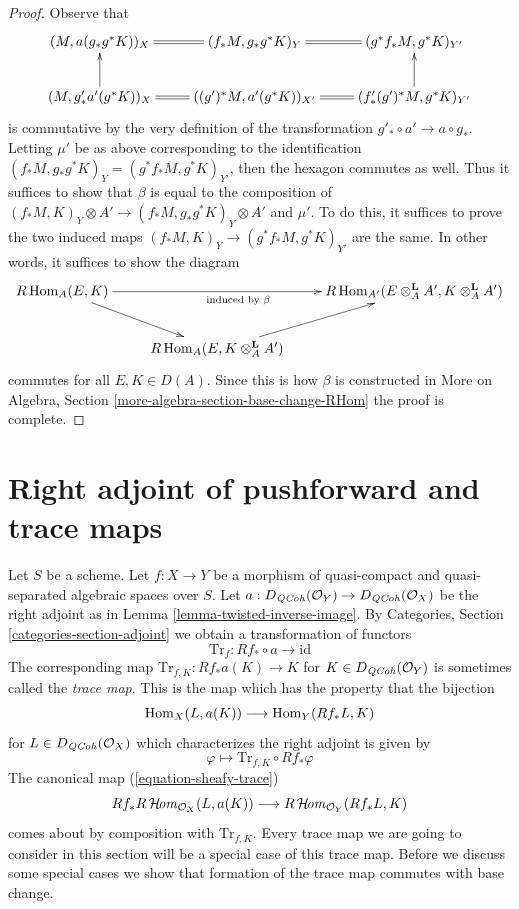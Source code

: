 \begin{proof}
\medskip\noindent
Observe that
$$
\xymatrix{
(M, a(g_*g^*K))_X &
(f_*M, g_* g^*K)_Y \ar@{=}[l] &
(g^*f_*M, g^*K)_{Y'} \ar@{=}[l] \\
(M, g'_* a'(g^*K))_X \ar[u] &
((g')^*M, a'(g^*K))_{X'} \ar@{=}[l] &
(f'_*(g')^*M, g^*K)_{Y'} \ar@{=}[l] \ar[u]
}
$$
is commutative by the very definition of the transformation
$g'_* \circ a' \to a \circ g_*$. Letting $\mu'$ be as above
corresponding to the identification
$(f_*M, g_*g^*K)_Y = (g^*f_*M, g^*K)_{Y'}$, then the
hexagon commutes as well. Thus it suffices to show that
$\beta$ is equal to the composition of
$(f_*M, K)_Y \otimes A' \to (f_*M, g_*g^*K)_Y \otimes A'$
and $\mu'$. To do this, it suffices to prove the two induced maps
$(f_*M, K)_Y \to (g^*f_*M, g^*K)_{Y'}$ are the same.
In other words, it suffices to show the diagram
$$
\xymatrix{
R\Hom_A(E, K) \ar[rr]_{\text{induced by }\beta} \ar[rd] & &
R\Hom_{A'}(E \otimes_A^\mathbf{L} A', K \otimes_A^\mathbf{L} A') \\
& R\Hom_A(E, K \otimes_A^\mathbf{L} A') \ar[ru]
}
$$
commutes for all $E, K \in D(A)$. Since this is how $\beta$ is constructed in
More on Algebra, Section \ref{more-algebra-section-base-change-RHom}
the proof is complete.
\end{proof}









\section{Right adjoint of pushforward and trace maps}
\label{section-trace}

\noindent
Let $S$ be a scheme.
Let $f : X \to Y$ be a morphism of quasi-compact and quasi-separated
algebraic spaces over $S$.
Let $a : D_{\mathit{QCoh}}(\mathcal{O}_Y) \to D_{\mathit{QCoh}}(\mathcal{O}_X)$
be the right adjoint as in Lemma \ref{lemma-twisted-inverse-image}. By
Categories, Section \ref{categories-section-adjoint} we obtain a
transformation of functors
$$
\text{Tr}_f : Rf_* \circ a \longrightarrow \text{id}
$$
The corresponding map $\text{Tr}_{f, K} : Rf_*a(K) \longrightarrow K$
for $K \in D_{\mathit{QCoh}}(\mathcal{O}_Y)$ is sometimes called the {\it trace map}.
This is the map which has the property that the bijection
$$
\mathop{\mathrm{Hom}}\nolimits_X(L, a(K)) \longrightarrow \mathop{\mathrm{Hom}}\nolimits_Y(Rf_*L, K)
$$
for $L \in D_{\mathit{QCoh}}(\mathcal{O}_X)$ which characterizes the right adjoint
is given by
$$
\varphi \longmapsto \text{Tr}_{f, K} \circ Rf_*\varphi
$$
The canonical map (\ref{equation-sheafy-trace})
$$
Rf_*R\mathop{\mathcal{H}\!\mathit{om}}\nolimits_{\mathcal{O}_X}(L, a(K))
\longrightarrow
R\mathop{\mathcal{H}\!\mathit{om}}\nolimits_{\mathcal{O}_Y}(Rf_*L, K)
$$
comes about by composition with $\text{Tr}_{f, K}$.
Every trace map we are going to consider in this section will be a
special case of this trace map. Before we discuss some special cases
we show that formation of the trace map commutes with base change.

